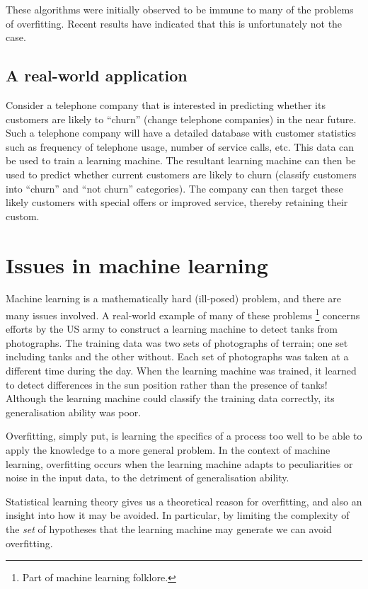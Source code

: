 These algorithms were initially observed to be immune to many of the
problems of overfitting.  Recent results have indicated that this is
unfortunately not the case.

\subsection{A real-world application}
\label{sec:churn example}

Consider a telephone company that is interested in predicting whether
its customers are likely to ``churn'' (change telephone companies) in
the near future.  Such a telephone company will have a detailed
database with customer statistics such as frequency of telephone
usage, number of service calls, etc.  This data can be used to train a
learning machine.   The resultant learning machine can then be used to
predict whether current customers are likely to churn (classify
customers into ``churn'' and ``not churn'' categories).  The company
can then target these likely customers with special offers or improved
service, thereby retaining their custom.

\section{Issues in machine learning}

Machine learning is a mathematically hard (ill-posed) problem, and
there are many issues involved.  A real-world example of many of these
problems%
\footnote{Part of machine learning folklore.}
concerns efforts by the US army to construct a learning machine to
detect tanks from photographs.  The training data was two sets of
photographs of terrain; one set including tanks and the other without.
Each set of  photographs was taken at a different time during the day.
When the learning machine was trained, it learned to detect
differences in the sun position rather than the presence of tanks!
Although the learning machine could classify the training data
correctly, its generalisation ability was poor.

Overfitting, simply put, is learning the specifics of a process too
well to be able to apply the knowledge to a more general problem.  In
the context of machine learning, overfitting occurs when the learning
machine adapts to peculiarities or noise in the input data, to the
detriment of generalisation ability.

Statistical learning theory gives us a theoretical reason for
overfitting, and also an insight into how it may be avoided.  In
particular, by limiting the complexity of the \emph{set} of hypotheses
that the learning machine may generate we can avoid overfitting.


